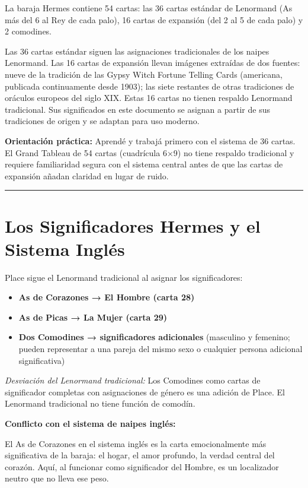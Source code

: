 La baraja Hermes contiene 54 cartas: las 36 cartas estándar de Lenormand (As más del 6 al Rey de cada palo), 16 cartas de expansión (del 2 al 5 de cada palo) y 2 comodines.

Las 36 cartas estándar siguen las asignaciones tradicionales de los naipes Lenormand. Las 16 cartas de expansión llevan imágenes extraídas de dos fuentes: nueve de la tradición de las Gypsy Witch Fortune Telling Cards (americana, publicada continuamente desde 1903); las siete restantes de otras tradiciones de oráculos europeos del siglo XIX. Estas 16 cartas no tienen respaldo Lenormand tradicional. Sus significados en este documento se asignan a partir de sus tradiciones de origen y se adaptan para uso moderno.

\textbf{Orientación práctica:} Aprendé y trabajá primero con el sistema de 36 cartas. El Grand Tableau de 54 cartas (cuadrícula 6×9) no tiene respaldo tradicional y requiere familiaridad segura con el sistema central antes de que las cartas de expansión añadan claridad en lugar de ruido.

\begin{center}\rule{0.5\linewidth}{0.5pt}\end{center}

\section{Los Significadores Hermes y el Sistema Inglés}\label{the-hermes-significators-and-the-english-system}

Place sigue el Lenormand tradicional al asignar los significadores:

\begin{itemize}
\tightlist
\item
  \textbf{As de Corazones → El Hombre (carta 28)}
\item
  \textbf{As de Picas → La Mujer (carta 29)}
\item
  \textbf{Dos Comodines → significadores adicionales} (masculino y femenino; pueden representar a una pareja del mismo sexo o cualquier persona adicional significativa)
\end{itemize}

\emph{Desviación del Lenormand tradicional:} Los Comodines como cartas de significador completas con asignaciones de género es una adición de Place. El Lenormand tradicional no tiene función de comodín.

\textbf{Conflicto con el sistema de naipes inglés:}

El As de Corazones en el sistema inglés es la carta emocionalmente más significativa de la baraja: el hogar, el amor profundo, la verdad central del corazón. Aquí, al funcionar como significador del Hombre, es un localizador neutro que no lleva ese peso.

